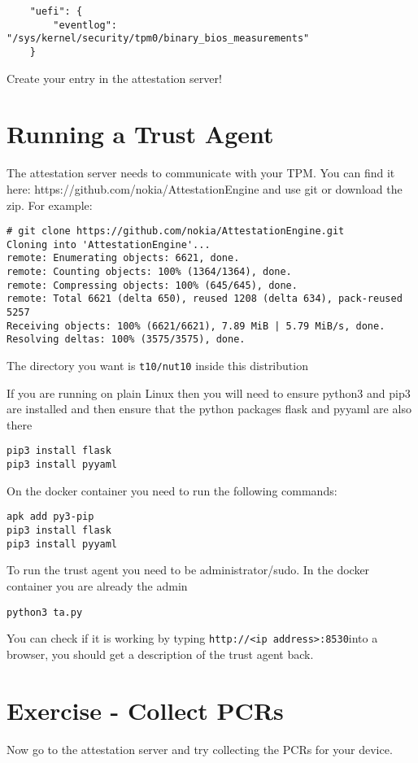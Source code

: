\documentclass[10pt,a4paper]{article}
\begin{document}
\begin{verbatim}
    "uefi": {
        "eventlog": "/sys/kernel/security/tpm0/binary_bios_measurements"
    }
\end{verbatim}


Create your entry in the attestation server!

\section{Running a Trust Agent}

The attestation server needs to communicate with your TPM.  You can find it here: https://github.com/nokia/AttestationEngine and use git or download the zip. For example:

\begin{verbatim}
# git clone https://github.com/nokia/AttestationEngine.git
Cloning into 'AttestationEngine'...
remote: Enumerating objects: 6621, done.
remote: Counting objects: 100% (1364/1364), done.
remote: Compressing objects: 100% (645/645), done.
remote: Total 6621 (delta 650), reused 1208 (delta 634), pack-reused 5257
Receiving objects: 100% (6621/6621), 7.89 MiB | 5.79 MiB/s, done.
Resolving deltas: 100% (3575/3575), done.
\end{verbatim}


The directory you want is \texttt{t10/nut10} inside this distribution

If you are running on plain Linux then you will need to ensure python3 and pip3 are installed and then ensure that the python packages flask and pyyaml are also there

\begin{verbatim}
pip3 install flask
pip3 install pyyaml
\end{verbatim}


On the docker container you need to run the following commands:

\begin{verbatim}
apk add py3-pip
pip3 install flask
pip3 install pyyaml
\end{verbatim}

To run the trust agent you need to be administrator/sudo. In the docker container you are already the admin

\texttt{python3 ta.py}

You can check if it is working by typing \texttt{http://<ip address>:8530}into a browser, you should get a description of the trust agent back.

\section{Exercise - Collect PCRs}
Now go to the attestation server and try collecting the PCRs for your device.
\end{document}

